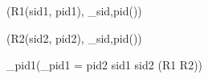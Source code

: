 
\rho(R1(\sid \rightarrow sid1, \pid \rightarrow pid1), \pi_{sid,pid}(\Suppliers \Join \Catalog))

\rho(R2(\sid \rightarrow sid2, \pid \rightarrow pid2), \pi_{sid,pid}(\Suppliers \Join \Catalog))

\pi_{pid1}(\sigma_{pid1 = pid2 \land sid1 \neq sid2 }(R1 \times R2))
